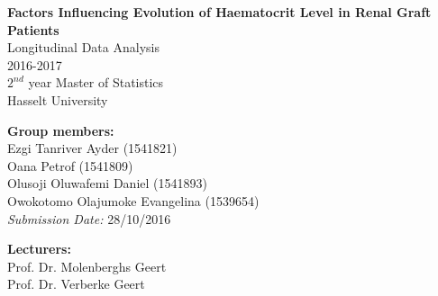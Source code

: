 \documentclass[11pt]{article}
\begin{document}
\clearpage\thispagestyle{empty}

\begin{center}
	\textbf{\huge{Factors Influencing Evolution of Haematocrit Level in Renal Graft Patients}} \\[1.7cm]
	\Large{
	Longitudinal Data Analysis \\
	2016-2017 \\[0.5cm]
	$2^{nd}$ year Master of Statistics \\
	Hasselt University	
	}
\end{center}

\vspace*{1cm}
\textbf{\large{Group members:}}\\
Ezgi Tanriver Ayder (1541821) \\
Oana Petrof (1541809) \\
Olusoji Oluwafemi Daniel (1541893) \\
Owokotomo Olajumoke Evangelina (1539654) \\[0.5cm]

\noindent\textit{Submission Date:} 28/10/2016

\vspace*{3cm}
\textbf{\large{Lecturers:}}\\
Prof. Dr. Molenberghs Geert  \\
Prof. Dr.  Verberke Geert


\newpage \setcounter{page}{1}
\end{document}
